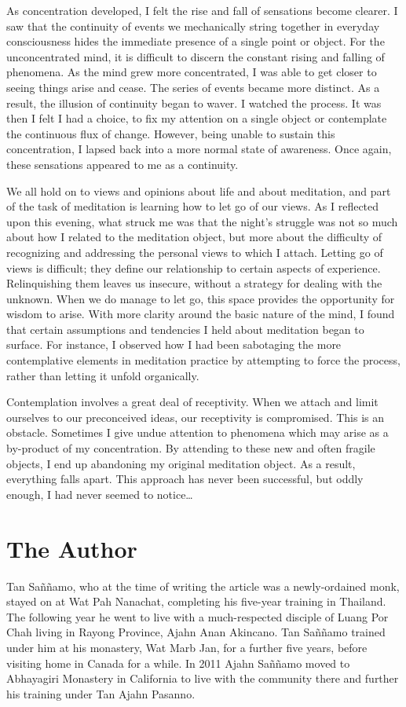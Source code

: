 As concentration developed, I felt the rise and fall of sensations
become clearer. I saw that the continuity of events we mechanically
string together in everyday consciousness hides the immediate presence
of a single point or object. For the unconcentrated mind, it is
difficult to discern the constant rising and falling of phenomena. As
the mind grew more concentrated, I was able to get closer to seeing
things arise and cease. The series of events became more distinct. As a
result, the illusion of continuity began to waver. I watched the
process. It was then I felt I had a choice, to fix my attention on a
single object or contemplate the continuous flux of change. However, 
being unable to sustain this concentration, I lapsed back into a more
normal state of awareness. Once again, these sensations appeared to me
as a continuity. 

We all hold on to views and opinions about life and about meditation, 
and part of the task of meditation is learning how to let go of our
views. As I reflected upon this evening, what struck me was that the
night's struggle was not so much about how I related to the meditation
object, but more about the difficulty of recognizing and addressing the
personal views to which I attach. Letting go of views is difficult; they
define our relationship to certain aspects of experience. Relinquishing
them leaves us insecure, without a strategy for dealing with the
unknown. When we do manage to let go, this space provides the
opportunity for wisdom to arise. With more clarity around the basic
nature of the mind, I found that certain assumptions and tendencies I
held about meditation began to surface. For instance, I observed how I
had been sabotaging the more contemplative elements in meditation
practice by attempting to force the process, rather than letting it
unfold organically. 

Contemplation involves a great deal of receptivity. When we attach and
limit ourselves to our preconceived ideas, our receptivity is
compromised. This is an obstacle. Sometimes I give undue attention to
phenomena which may arise as a by-product of my concentration. By
attending to these
new and often fragile objects, I end up abandoning my original
meditation object. As a result, everything falls apart. This approach
has never been successful, but oddly enough, I had never seemed to
notice\ldots{}

\dividerRule

\section{The Author}

Tan Saññamo, who at the time of writing the article was a
newly-ordained monk, stayed on at Wat Pah Nanachat, completing his
five-year training in Thailand. The following year he went to live with
a much-respected disciple of Luang Por Chah living in Rayong Province, 
Ajahn Anan Akincano. Tan Saññamo trained under him at his monastery, Wat
Marb Jan, for a further five years, before visiting home in Canada for a
while. In 2011 Ajahn Saññamo moved to Abhayagiri Monastery in California
to live with the community there and further his training under Tan
Ajahn Pasanno.

